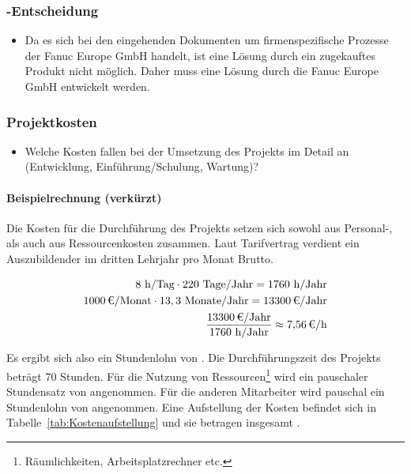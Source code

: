\subsubsection{-Entscheidung}
\label{sec:MakeOrBuyEntscheidung}
\begin{itemize}
	\item Da es sich bei den eingehenden Dokumenten um firmenspezifische Prozesse der Fanuc Europe GmbH handelt, ist eine Lösung durch ein zugekauftes Produkt nicht möglich. 
	Daher muss eine Lösung durch die Fanuc Europe GmbH entwickelt werden.
\end{itemize}


\subsubsection{Projektkosten}
\label{sec:Projektkosten}
\begin{itemize}
	\item Welche Kosten fallen bei der Umsetzung des Projekts im Detail an (\zB Entwicklung, Einführung/Schulung, Wartung)?
\end{itemize}

\paragraph{Beispielrechnung (verkürzt)}
Die Kosten für die Durchführung des Projekts setzen sich sowohl aus Personal-, als auch aus Ressourcenkosten zusammen.
Laut Tarifvertrag verdient ein Auszubildender im dritten Lehrjahr pro Monat  Brutto. 

\begin{eqnarray}
8 \mbox{ h/Tag} \cdot 220 \mbox{ Tage/Jahr} = 1760 \mbox{ h/Jahr}\\
\eur{1000}\mbox{/Monat} \cdot 13,3 \mbox{ Monate/Jahr} = \eur{13300} \mbox{/Jahr}\\
\frac{\eur{13300} \mbox{/Jahr}}{1760 \mbox{ h/Jahr}} \approx \eur{7,56}\mbox{/h}
\end{eqnarray}

Es ergibt sich also ein Stundenlohn von . 
Die Durchführungszeit des Projekts beträgt 70 Stunden. Für die Nutzung von Ressourcen\footnote{Räumlichkeiten, Arbeitsplatzrechner etc.} wird 
ein pauschaler Stundensatz von  angenommen. Für die anderen Mitarbeiter wird pauschal ein Stundenlohn von  angenommen. 
Eine Aufstellung der Kosten befindet sich in Tabelle~\ref{tab:Kostenaufstellung} und sie betragen insgesamt .


